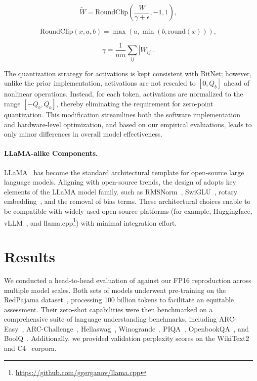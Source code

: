 \begin{equation}
    \widetilde{W} = \mathrm{RoundClip}(\frac{W}{\gamma + \epsilon}, -1, 1),
\end{equation}

\begin{equation}
    \mathrm{RoundClip}(x, a, b) = \max(a, \min(b, \mathrm{round}(x))),
\end{equation}

\begin{equation}
    \gamma = \frac{1}{nm}\sum_{ij} |W_{ij}|.
\end{equation}

The quantization strategy for activations is kept consistent with BitNet; however, unlike the prior implementation, activations are not rescaled to $[0, Q_b]$ ahead of nonlinear operations. Instead, for each token, activations are normalized to the range $[-Q_b, Q_b]$, thereby eliminating the requirement for zero-point quantization. This modification streamlines both the software implementation and hardware-level optimization, and based on our empirical evaluations, leads to only minor differences in overall model effectiveness.

\paragraph{LLaMA-alike Components.}

LLaMA~\cite{llama, llama2} has become the standard architectural template for open-source large language models. Aligning with open-source trends, the design of  adopts key elements of the LLaMA model family, such as RMSNorm~\cite{rmsnorm}, SwiGLU~\cite{swiglu}, rotary embedding~\cite{rope}, and the removal of bias terms. These architectural choices enable  to be compatible with widely used open-source platforms (for example, Huggingface, vLLM~\cite{vllm}, and llama.cpp\footnote{\url{https://github.com/ggerganov/llama.cpp}}) with minimal integration effort.

\section{Results}

We conducted a head-to-head evaluation of  against our FP16  reproduction across multiple model scales. Both sets of models underwent pre-training on the RedPajama dataset~\cite{redpajama}, processing 100 billion tokens to facilitate an equitable assessment. Their zero-shot capabilities were then benchmarked on a comprehensive suite of language understanding benchmarks, including ARC-Easy~\cite{arc}, ARC-Challenge~\cite{arc}, Hellaswag~\cite{hellaswag}, Winogrande~\cite{winoGrande}, PIQA~\cite{piqa}, OpenbookQA~\cite{openbookqa}, and BoolQ~\cite{boolq}. Additionally, we provided validation perplexity scores on the WikiText2~\cite{wikitext2} and C4~\cite{c4} corpora.

